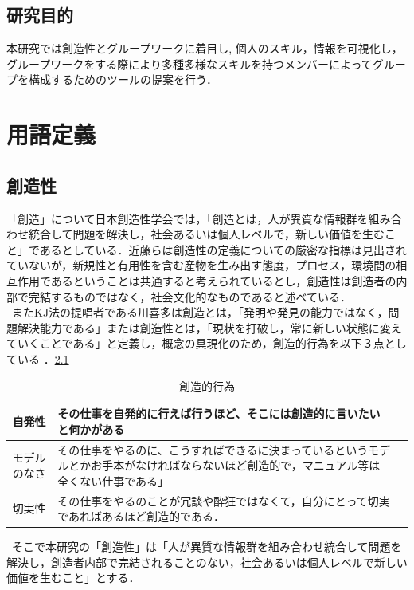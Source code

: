 \documentclass{funthesis}
\begin{document}
\section{研究目的}
本研究では創造性とグループワークに着目し,  個人のスキル，情報を可視化し，グループワークをする際により多種多様なスキルを持つメンバーによってグループを構成するためのツールの提案を行う．
\chapter{用語定義}
\section{創造性}
「創造」について日本創造性学会では，「創造とは，人が異質な情報群を組み合わせ統合して問題を解決し，社会あるいは個人レベルで，新しい価値を生むこと」であるとしている\cite{A12}．近藤らは\cite{A13}創造性の定義についての厳密な指標は見出されていないが，新規性と有用性を含む産物を生み出す態度，プロセス，環境間の相互作用であるということは共通すると考えられているとし，創造性は創造者の内部で完結するものではなく，社会文化的なものであると述べている．\\
\ またKJ法の提唱者である川喜多は創造とは，「発明や発見の能力ではなく，問題解決能力である」または創造性とは，「現状を打破し，常に新しい状態に変えていくことである」と定義し，概念の具現化のため，創造的行為を以下３点としている\cite{A14} \cite{A15}．\ref{souzousei}
\begin{table}[h]
\begin{center}
  \begin{tabular}{|c|p{105mm}|p{10mm}|} \hline
    自発性& その仕事を自発的に行えば行うほど、そこには創造的に言いたいと何かがある\tabularnewline \hline
    モデルのなさ& その仕事をやるのに、こうすればできるに決まっているというモデルとかお手本がなければならないほど創造的で，マニュアル等は全くない仕事である」 \tabularnewline \hline
    切実性&その仕事をやるのことが冗談や酔狂ではなくて，自分にとって切実であればあるほど創造的である．\tabularnewline
    \hline
  \end{tabular}
  \caption{創造的行為}
  \label{souzousei}
  \end{center}
\end{table}


\ そこで本研究の「創造性」は「人が異質な情報群を組み合わせ統合して問題を解決し，創造者内部で完結されることのない，社会あるいは個人レベルで新しい価値を生むこと」とする．
\end{document}
